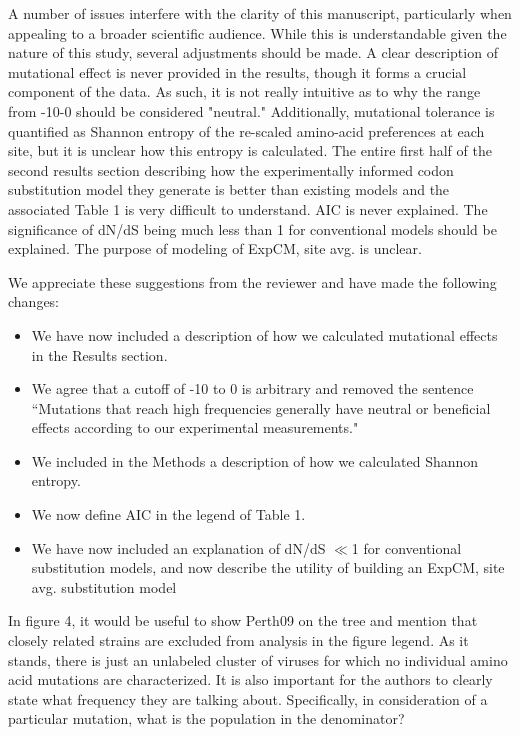 \documentclass[11pt, oneside]{article}   	%
\newcommand{\response}[1]{{\color{black}#1}}
\begin{document}
A number of issues interfere with the clarity of this manuscript, particularly when appealing to a broader scientific audience. While this is understandable given the nature of this study, several adjustments should be made. A clear description of mutational effect is never provided in the results, though it forms a crucial component of the data. As such, it is not really intuitive as to why the range from -10-0 should be considered "neutral." Additionally, mutational tolerance is quantified as Shannon entropy of the re-scaled amino-acid preferences at each site, but it is unclear how this entropy is calculated. The entire first half of the second results section describing how the experimentally informed codon substitution model they generate is better than existing models and the associated Table 1 is very difficult to understand. AIC is never explained. The significance of dN/dS being much less than 1 for conventional models should be explained. The purpose of modeling of ExpCM, site avg. is unclear. 

\response{We appreciate these suggestions from the reviewer and have made the following changes:
\begin{itemize}
\item We have now included a description of how we calculated mutational effects in the Results section.
\item We agree that a cutoff of -10 to 0 is arbitrary and removed the sentence ``Mutations that reach high frequencies generally have neutral or beneficial effects according to our experimental measurements." 
\item We included in the Methods a description of how we calculated Shannon entropy.
\item We now define AIC in the legend of Table 1.
\item We have now included an explanation of dN/dS $\ll$1 for conventional substitution models, and now describe the utility of building an ExpCM, site avg. substitution model
\end{itemize}
}

In figure 4, it would be useful to show Perth09 on the tree and mention that closely related strains are excluded from analysis in the figure legend. As it stands, there is just an unlabeled cluster of viruses for which no individual amino acid mutations are characterized. It is also important for the authors to clearly state what frequency they are talking about. Specifically, in consideration of a particular mutation, what is the population in the denominator? 
\end{document}
